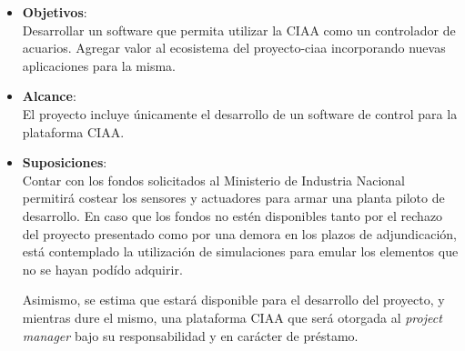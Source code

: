 \begin{itemize}

\item \textbf{Objetivos}:\\
	Desarrollar un software que permita utilizar la CIAA como un controlador de acuarios. Agregar valor al ecosistema del proyecto-ciaa incorporando nuevas aplicaciones para la misma.
	
	\item \textbf{Alcance}:\\
	El proyecto incluye únicamente el desarrollo de un software de control para la plataforma CIAA.

	

	\item \textbf{Suposiciones}:\\
	Contar con los fondos solicitados al Ministerio de Industria Nacional permitirá costear los sensores y actuadores para armar una planta piloto de desarrollo.  En caso que los fondos no estén disponibles tanto por el rechazo del proyecto presentado como por una demora en los plazos de adjundicación, está contemplado la utilización de simulaciones para emular los elementos que no se hayan podído adquirir.
	
	Asimismo, se estima que estará disponible para el desarrollo del proyecto, y mientras dure el mismo, una plataforma CIAA que será otorgada al \textit{project manager} bajo su responsabilidad y en carácter de préstamo.
	
	\end{itemize}

